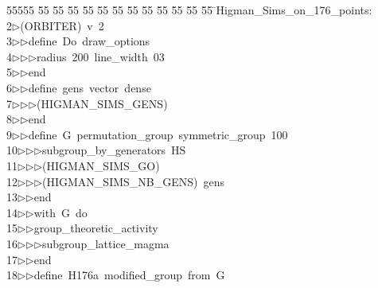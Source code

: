 %
%
\begin{tabbing}
55555 \= 55 \= 55 \= 55 \= 55 \= 55 \= 55 \= 55 \= 55 \= 55 \= 55 \= 55 \= 55 \= \>Higman\_Sims\_on\_176\_points:\\[0pt]
2\>$\triangleright$\>(ORBITER)\ v\ 2\ \\[0pt]
3\>$\triangleright$\>$\triangleright$\>define\ Do\ draw\_options\ \\[0pt]
4\>$\triangleright$\>$\triangleright$\>$\triangleright$\>radius\ 200\ line\_width\ 03\ \\[0pt]
5\>$\triangleright$\>$\triangleright$\>end\ \\[0pt]
6\>$\triangleright$\>$\triangleright$\>define\ gens\ vector\ dense\ \\[0pt]
7\>$\triangleright$\>$\triangleright$\>$\triangleright$\>(HIGMAN\_SIMS\_GENS)\ \\[0pt]
8\>$\triangleright$\>$\triangleright$\>end\ \\[0pt]
9\>$\triangleright$\>$\triangleright$\>define\ G\ permutation\_group\ symmetric\_group\ 100\ \\[0pt]
10\>$\triangleright$\>$\triangleright$\>$\triangleright$\>subgroup\_by\_generators\ HS\ \\[0pt]
11\>$\triangleright$\>$\triangleright$\>$\triangleright$\>(HIGMAN\_SIMS\_GO)\ \\[0pt]
12\>$\triangleright$\>$\triangleright$\>$\triangleright$\>(HIGMAN\_SIMS\_NB\_GENS)\ gens\ \\[0pt]
13\>$\triangleright$\>$\triangleright$\>end\ \\[0pt]
14\>$\triangleright$\>$\triangleright$\>with\ G\ do\ \\[0pt]
15\>$\triangleright$\>$\triangleright$\>group\_theoretic\_activity\ \\[0pt]
16\>$\triangleright$\>$\triangleright$\>$\triangleright$\>subgroup\_lattice\_magma\ \\[0pt]
17\>$\triangleright$\>$\triangleright$\>end\ \\[0pt]
18\>$\triangleright$\>$\triangleright$\>define\ H176a\ modified\_group\ from\ G\ \\[0pt]

\end{tabbing}
